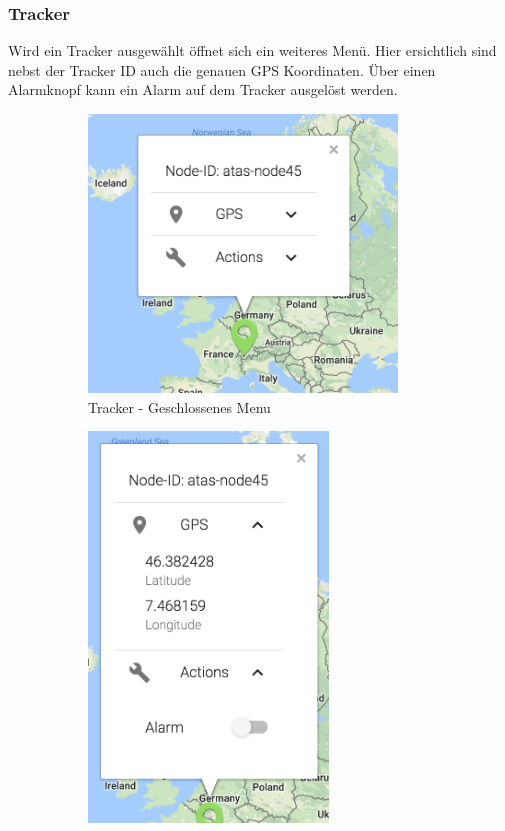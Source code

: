 \documentclass[11pt,english,german]{report}
\theoremstyle{definition}
\begin{document}
\subsubsection{Tracker}
Wird ein Tracker ausgewählt öffnet sich ein weiteres Menü.  Hier ersichtlich sind nebst der Tracker ID auch die genauen GPS Koordinaten. Über einen Alarmknopf kann ein Alarm auf dem Tracker ausgelöst werden.
\begin{figure}[H]
	\centering
	\begin{subfigure}{.45\textwidth}
		\centering
		\includegraphics[width=0.9\textwidth]{img/atasweb/atas-web-node-closed.png}
		\caption[Tracker - Geschlossenes Menu]
		{Tracker - Geschlossenes Menu}
	\end{subfigure}%
	\begin{subfigure}{.45\textwidth}
		\centering
		\includegraphics[width=0.7\textwidth]{img/atasweb/atas-web-node-open.png}

\end{subfigure}
\end{figure}
\end{document}
